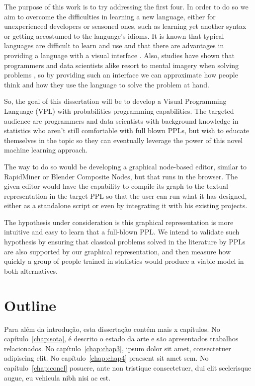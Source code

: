 The purpose of this work is to try addressing the first four. In order to do so we
aim to overcome the difficulties in learning a new language, either for
unexperienced developers or seasoned ones, such as learning yet another syntax
or getting accostumed to the language's idioms. It is known that typical
languages are difficult to learn and use \cite{empstud} and that there are
advantages in providing a language with a visual interface \cite{dfbeg}. Also,
studies have shown that programmers and data scientists alike resort to mental
imagery when solving problems \cite{Dastani2002}\cite{Petre1999}, so by
providing such an interface we can approximate how people think and how they
use the language to solve the problem at hand.

So, the goal of this dissertation will be to develop a Visual Programming
Language (VPL) with probabilitics programming capabilities. The targeted
audience are programmers and data scientists with background knowledge in
statistics who aren't still comfortable
with full blown PPLs, but wish to educate themselves in the topic so they can
eventually leverage the power of this novel machine learning approach.

The way to do so would be developing a graphical node-based editor, similar to
RapidMiner or Blender Composite Nodes, but that runs in the browser. The given
editor would have the capability to compile its graph to the textual
representation in the target PPL so that the user can run what it has designed,
either as a standalone script or even by integrating it with his existing
projects.

The hypothesis under consideration is this graphical representation
is more intuitive and easy to learn that a full-blown PPL.
We intend to validate such hypothesis by ensuring that classical problems solved
in the literature by PPLs are also supported by our graphical representation,
and then measure how quickly a group of people trained in statistics would
produce a viable model in both alternatives.

\section{Outline} \label{sec:struct}

Para além da introdução, esta dissertação contém mais x capítulos.
No capítulo~\ref{chap:sota}, é descrito o estado da arte e são
apresentados trabalhos relacionados.
No capítulo~\ref{chap:chap3}, ipsum dolor sit amet, consectetuer
adipiscing elit.
No capítulo~\ref{chap:chap4} praesent sit amet sem.
No capítulo~\ref{chap:concl}  posuere, ante non tristique
consectetuer, dui elit scelerisque augue, eu vehicula nibh nisi ac
est.
